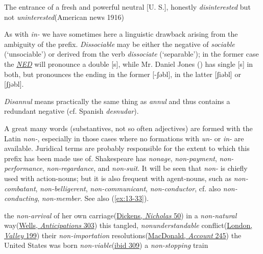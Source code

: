 \ea \label{ex:13-32} The entrance of a fresh and powerful neutral [U. S.], honestly \emph{disinterested} but not \emph{uninterested}\hfill(American news 1916)
\z

As with \textit{in-} we have sometimes here a linguistic drawback arising from the ambiguity of the prefix. \textit{Dissociable} may be either the negative of \textit{sociable} (`unsociable') or derived from the verb \textit{dissociate} (`separable'); in the former case 
the \href{https://archive.org/details/oed03arch/page/n527/mode/2up?view=theater}{\textit{NED}} will pronounce a double [s], while Mr. Daniel Jones (\citeyear[136]{jones1917everyman}) %
has single [s] in both, but pronounces the ending in the former [-ʃəbl], in the latter [ʃiəbl] or [ʃjəbl].%

\textit{Disannul} means practically the same thing as \textit{annul} and thus contains a redundant negative (cf. Spanish \textit{desnudar}).


A great many words (substantives, not so often adjectives) are formed with the 
Latin \textit{non-}, especially in those cases where no formations with \textit{un-} or \textit{in-} are available. Juridical terms are probably responsible for the extent to which this prefix has been made use of. Shakespeare has \textit{nonage}, \textit{non-payment}, \textit{non-performance}, \textit{non-regardance}, and \textit{non-suit}. It will be seen that \textit{non-} is chiefly used with action-nouns; but it is also frequent with agent-nouns, such as \textit{non-combatant}, \textit{non-belligerent}, \textit{non-communicant}, \textit{non-conductor}, cf. also \textit{non-conducting}, \textit{non-member}. See also (\ref{ex:13-33}).

\ea \label{ex:13-33}
\ea the \emph{non-arrival} of her own carriage\hfill(\href{https://archive.org/details/lifeadventuresofdickrich/page/60/mode/2up?q=%22non-arrival%22&view=theater}{Dickens, \textit{Nicholas} 50})
\ex in a \emph{non-natural} way\hfill(\href{https://archive.org/details/in.ernet.dli.2015.351554/page/n307/mode/2up?q=%22non-natural+way%22&view=theater}{Wells, \textit{Anticipations} 303})
\ex this tangled, \emph{nonunderstandable} conflict\hfill(\href{https://archive.org/details/valleyofmoon00londrich/page/n207/mode/2up?view=theater&q=%22this+tangled%22}{London, \textit{Valley} 199})
\ex their \emph{non-importation} resolutions\hfill(\href{https://archive.org/details/benfrankautobio00franrich/page/244/mode/2up?q=%22non-importation%22&view=theater}{MacDonald, \textit{Account} 245})
\ex the United States was born \emph{non-viable}\hfill(\href{https://archive.org/details/benfrankautobio00franrich/page/308/mode/2up?q=%22born+non-viable%22&view=theater}{ibid 309})
\ex a \emph{non-stopping} train
\z
\z
{}

